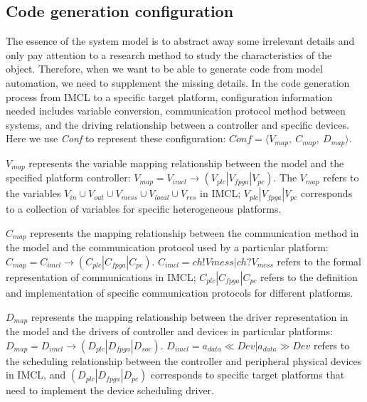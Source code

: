 \subsection{Code generation configuration}
The essence of the system model is to abstract away some irrelevant details and only pay attention to a research method to study the characteristics of the object. Therefore, when we want to be able to generate code from model automation, we need to supplement the missing details. In the code generation process from IMCL to a specific target platform, configuration information needed  includes variable conversion, communication protocol method between systems, and the driving relationship between a controller and specific devices. Here we use \emph{Conf} to represent these configuration: $Conf = \langle V_{map}, \ C_{map}, \ D_{map} \rangle$.

$V_{map}$ represents the variable mapping relationship between the model and the specified platform controller: $V_{map} = V_{imcl} \rightarrow (V_{plc} | V_{fpga}| V_{pc})$. The $V_{map}$ refers to the variables $V_{in} \cup V_{out} \cup V_{mess} \cup V_{local} \cup V_{res}$ in IMCL;  $V_{plc} | V_{fpga} | V_{pc}$ corresponds to a collection of variables for specific heterogeneous platforms.

$C_{map}$ represents the mapping relationship between the communication method in the model and the communication protocol used by a particular platform: $C_{map} = C_{imcl} \rightarrow (C_{plc} | C_{fpga} | C_{pc})$. $C_{imcl} = ch!Vmess | ch?V_{mess}$ refers to the formal representation of communications in IMCL; $C_{plc} | C_{fpga} | C_{pc}$ refers to the definition and implementation of specific communication protocols for different platforms.

$D_{map}$ represents the mapping relationship between the driver representation in the model and the drivers of controller and devices in  particular platforms: $D_{map} = D_{imcl} \rightarrow (D_{plc} | D_{fpga} | D_{soc})$.  $D_{imcl}=a_{data} \ll Dev | a_{data} \gg Dev$ refers to the scheduling relationship between the controller and peripheral physical devices in IMCL, and $(D_{plc} | D_{fpga} | D_{pc})$ corresponds to specific target platforms that need to implement the device scheduling driver. 
